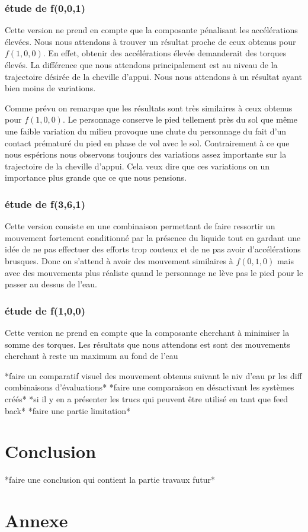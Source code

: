 \documentclass{llncs}
\begin{document}
\subsubsection{étude de f(0,0,1)}
Cette version ne prend en compte que la composante pénalisant les accélérations élevées. Nous nous attendons à trouver un résultat proche de ceux obtenus pour $f(1,0,0)$. En effet, obtenir des accélérations élevée demanderait des torques élevés. La différence que nous attendons principalement est au niveau de la trajectoire désirée de la cheville d'appui. Nous nous attendons à un résultat ayant bien moins de variations.

Comme prévu on remarque que les résultats sont très similaires à ceux obtenus pour $f(1,0,0)$. Le personnage conserve le pied tellement près du sol que même une faible variation du milieu provoque une chute du personnage du fait d'un contact prématuré du pied en phase de vol avec le sol. Contrairement à ce que nous espérions nous observons toujours des variations assez importante sur la trajectoire de la cheville d'appui. Cela veux dire que ces variations on un importance plus grande que ce que nous pensions.


\subsubsection{étude de f(3,6,1)}
Cette version consiste en une combinaison permettant de faire ressortir un mouvement fortement conditionné par la présence du liquide tout en gardant une idée de ne pas effectuer des efforts trop couteux et de ne pas avoir d'accélérations brusques. Donc on s'attend à avoir des mouvement similaires à $f(0,1,0)$ mais avec des mouvements plus réaliste quand le personnage ne lève pas le pied pour le passer au dessus de l'eau. 


\subsubsection{étude de f(1,0,0)}
Cette version ne prend en compte que la composante cherchant à minimiser la somme des torques. Les résultats que nous attendons est sont des mouvements cherchant à reste un maximum au fond de l'eau 

*faire un comparatif visuel des mouvement obtenus suivant le niv d'eau pr les diff combinaisons d'évaluations*
*faire une comparaison en désactivant les systèmes créés*
*si il y en a présenter les trucs qui peuvent être utilisé en tant que feed back*
*faire une partie limitation*

\section{Conclusion}
%
*faire une conclusion qui contient la partie travaux futur*
%



%
\nocite{*}


%
\newpage
\section{Annexe}
\end{document}

